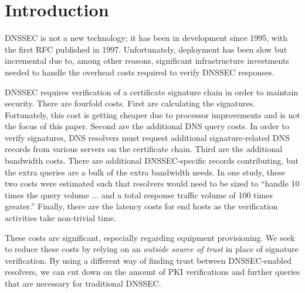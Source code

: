 \section{Introduction}\label{sec:intro}

DNSSEC is not a new technology; it has been in development since 1995, with the
first RFC published in 1997.\cite{dnssecHistory} Unfortunately, deployment 
has been slow but incremental due to, among other reasons, significant 
infrastructure investments needed to handle the overhead costs
required to verify DNSSEC responses.

DNSSEC requires verification of a certificate signature chain in order to 
maintain security. There are fourfold costs. First are calculating the 
signatures. Fortunately, this cost is getting cheaper due to processor 
improvements and is not the focus of this paper. Second are the additional DNS 
query costs. In order to verify signatures, DNS resolvers must request 
additional signature-related DNS records from various servers on the certificate
chain.
Third are the additional bandwidth costs. There are additional DNSSEC-specific 
records contributing, but the extra queries are a bulk of the extra bandwidth 
needs.
In one study, these two costs were estimated such that 
resolvers would need to be sized to ``handle 10 times the query volume ... and a
total response traffic volume of 100 times greater.''\cite{huston2013} 
Finally, there are the latency costs for end hosts as the verification 
activities take  non-trivial time.

These costs are significant, especially regarding equipment provisioning. We 
seek to reduce these costs by relying on an \emph{outside source of trust} in
place of signature verification. 
By using a different way of finding trust between DNSSEC-enabled resolvers, we 
can cut down on the amount of PKI verifications and further queries that are 
necessary for traditional DNSSEC. 

